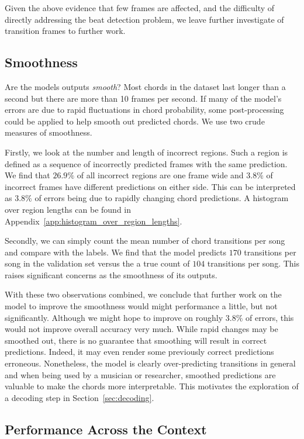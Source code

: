Given the above evidence that few frames are affected, and the difficulty of directly addressing the beat detection problem, we leave further investigate of transition frames to further work.


\subsection{Smoothness}\label{sec:smoothness}

Are the models outputs \emph{smooth}? Most chords in the dataset last longer than a second but there are more than 10 frames per second. If many of the model's errors are due to rapid fluctuations in chord probability, some post-processing could be applied to help smooth out predicted chords. We use two crude measures of smoothness.

Firstly, we look at the number and length of incorrect regions. Such a region is defined as a sequence of incorrectly predicted frames with the same prediction. We find that $26.9\%$ of all incorrect regions are one frame wide and $3.8\%$ of incorrect frames have different predictions on either side. This can be interpreted as $3.8\%$ of errors being due to rapidly changing chord predictions. A histogram over region lengths can be found in Appendix~\ref{app:histogram_over_region_lengths}.

Secondly, we can simply count the mean number of chord transitions per song and compare with the labels. We find that the model predicts $170$ transitions per song in the validation set versus the a true count of $104$ transitions per song. This raises significant concerns as the smoothness of its outputs. 

With these two observations combined, we conclude that further work on the model to improve the smoothness would might performance a little, but not significantly. Although we might hope to improve on roughly $3.8\%$ of errors, this would not improve overall accuracy very much. While rapid changes may be smoothed out, there is no guarantee that smoothing will result in correct predictions. Indeed, it may even render some previously correct predictions erroneous. Nonetheless, the model is clearly over-predicting transitions in general and when being used by a musician or researcher, smoothed predictions are valuable to make the chords more interpretable. This motivates the exploration of a decoding step in Section~\ref{sec:decoding}.

\subsection{Performance Across the Context}\label{sec:crnn_performance_across_context}

